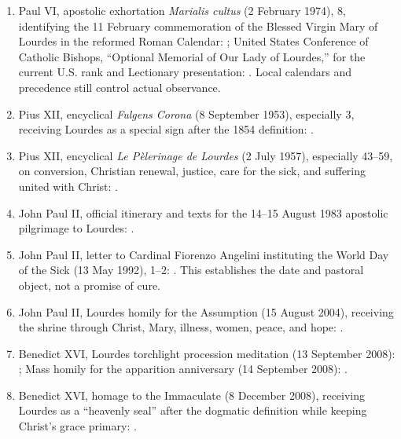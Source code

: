 \begin{enumerate}
  \item Paul VI, apostolic exhortation \emph{Marialis cultus} (2 February 1974), 8, identifying the 11 February commemoration of the Blessed Virgin Mary of Lourdes in the reformed Roman Calendar: ; United States Conference of Catholic Bishops, “Optional Memorial of Our Lady of Lourdes,” for the current U.S. rank and Lectionary presentation: . Local calendars and precedence still control actual observance.
  \item Pius XII, encyclical \emph{Fulgens Corona} (8 September 1953), especially 3, receiving Lourdes as a special sign after the 1854 definition: .
  \item Pius XII, encyclical \emph{Le Pèlerinage de Lourdes} (2 July 1957), especially 43--59, on conversion, Christian renewal, justice, care for the sick, and suffering united with Christ: .
  \item John Paul II, official itinerary and texts for the 14--15 August 1983 apostolic pilgrimage to Lourdes: .
  \item John Paul II, letter to Cardinal Fiorenzo Angelini instituting the World Day of the Sick (13 May 1992), 1--2: . This establishes the date and pastoral object, not a promise of cure.
  \item John Paul II, Lourdes homily for the Assumption (15 August 2004), receiving the shrine through Christ, Mary, illness, women, peace, and hope: .
  \item Benedict XVI, Lourdes torchlight procession meditation (13 September 2008): ; Mass homily for the apparition anniversary (14 September 2008): .
  \item Benedict XVI, homage to the Immaculate (8 December 2008), receiving Lourdes as a “heavenly seal” after the dogmatic definition while keeping Christ's grace primary: .
\end{enumerate}

\endgroup
